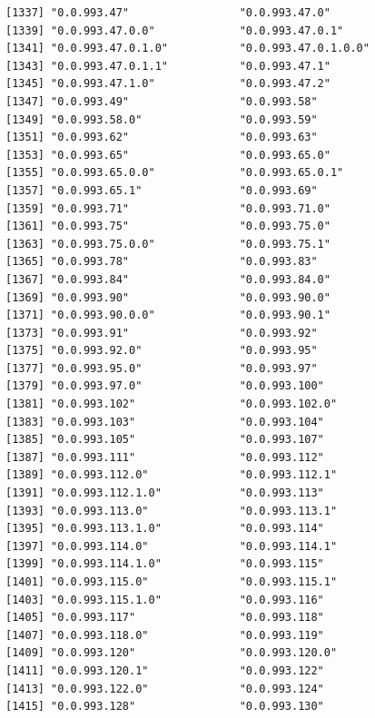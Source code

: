 \documentclass[
  letterpaper,
  DIV=11,
  numbers=noendperiod]{scrreprt}
\begin{document}
\begin{verbatim}
[1337] "0.0.993.47"                 "0.0.993.47.0"              
[1339] "0.0.993.47.0.0"             "0.0.993.47.0.1"            
[1341] "0.0.993.47.0.1.0"           "0.0.993.47.0.1.0.0"        
[1343] "0.0.993.47.0.1.1"           "0.0.993.47.1"              
[1345] "0.0.993.47.1.0"             "0.0.993.47.2"              
[1347] "0.0.993.49"                 "0.0.993.58"                
[1349] "0.0.993.58.0"               "0.0.993.59"                
[1351] "0.0.993.62"                 "0.0.993.63"                
[1353] "0.0.993.65"                 "0.0.993.65.0"              
[1355] "0.0.993.65.0.0"             "0.0.993.65.0.1"            
[1357] "0.0.993.65.1"               "0.0.993.69"                
[1359] "0.0.993.71"                 "0.0.993.71.0"              
[1361] "0.0.993.75"                 "0.0.993.75.0"              
[1363] "0.0.993.75.0.0"             "0.0.993.75.1"              
[1365] "0.0.993.78"                 "0.0.993.83"                
[1367] "0.0.993.84"                 "0.0.993.84.0"              
[1369] "0.0.993.90"                 "0.0.993.90.0"              
[1371] "0.0.993.90.0.0"             "0.0.993.90.1"              
[1373] "0.0.993.91"                 "0.0.993.92"                
[1375] "0.0.993.92.0"               "0.0.993.95"                
[1377] "0.0.993.95.0"               "0.0.993.97"                
[1379] "0.0.993.97.0"               "0.0.993.100"               
[1381] "0.0.993.102"                "0.0.993.102.0"             
[1383] "0.0.993.103"                "0.0.993.104"               
[1385] "0.0.993.105"                "0.0.993.107"               
[1387] "0.0.993.111"                "0.0.993.112"               
[1389] "0.0.993.112.0"              "0.0.993.112.1"             
[1391] "0.0.993.112.1.0"            "0.0.993.113"               
[1393] "0.0.993.113.0"              "0.0.993.113.1"             
[1395] "0.0.993.113.1.0"            "0.0.993.114"               
[1397] "0.0.993.114.0"              "0.0.993.114.1"             
[1399] "0.0.993.114.1.0"            "0.0.993.115"               
[1401] "0.0.993.115.0"              "0.0.993.115.1"             
[1403] "0.0.993.115.1.0"            "0.0.993.116"               
[1405] "0.0.993.117"                "0.0.993.118"               
[1407] "0.0.993.118.0"              "0.0.993.119"               
[1409] "0.0.993.120"                "0.0.993.120.0"             
[1411] "0.0.993.120.1"              "0.0.993.122"               
[1413] "0.0.993.122.0"              "0.0.993.124"               
[1415] "0.0.993.128"                "0.0.993.130"               

\end{verbatim}
\end{document}
